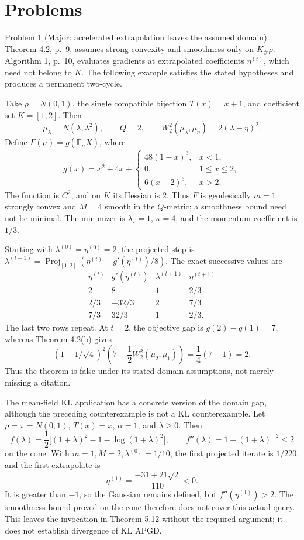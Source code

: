 \documentclass[10pt]{article}
\begin{document}
\section*{Problems}
Problem 1 (Major: accelerated extrapolation leaves the assumed domain).  Theorem 4.2, p. 9, assumes strong convexity and smoothness only on \(K_\#\rho\). Algorithm 1, p. 10, evaluates gradients at extrapolated coefficients \(\eta^{(t)}\), which need not belong to \(K\). The following example satisfies the stated hypotheses and produces a permanent two-cycle.\par
Take \(\rho=N(0,1)\), the single compatible bijection \(T(x)=x+1\), and coefficient set \(K=[1,2]\). Then \[\mu_\lambda=N(\lambda,\lambda^2),\qquad Q=2,\qquad
 W_2^2(\mu_\lambda,\mu_\eta)=2(\lambda-\eta)^2.\] Define \(F(\mu)=g(\mathbb E_\mu X)\), where \[g(x)=x^2+4x+
 \begin{cases}
 48(1-x)^3,&x<1,\\
 0,&1\leq x\leq2,\\
 6(x-2)^3,&x>2.
 \end{cases}\] The function is \(C^2\), and on \(K\) its Hessian is \(2\). Thus \(F\) is geodesically \(m=1\) strongly convex and \(M=4\) smooth in the \(Q\)-metric; a smoothness bound need not be minimal. The minimizer is \(\lambda_\star=1\), \(\kappa=4\), and the momentum coefficient is \(1/3\).\par
Starting with \(\lambda^{(0)}=\eta^{(0)}=2\), the projected step is \(\lambda^{(t+1)}=\mathop{\mathrm{Proj}}_{[1,2]}(\eta^{(t)}-g'(\eta^{(t)})/8)\). The exact successive values are \[\begin{array}{c|ccc}
 \eta^{(t)}&g'(\eta^{(t)})&\lambda^{(t+1)}&\eta^{(t+1)}\\ \hline
 2&8&1&2/3\\
 2/3&-32/3&2&7/3\\
 7/3&32/3&1&2/3 .
\end{array}\] The last two rows repeat. At \(t=2\), the objective gap is \(g(2)-g(1)=7\), whereas Theorem 4.2(b) gives \[(1-1/\sqrt4)^2
 \left(7+\frac12 W_2^2(\mu_2,\mu_1)\right)
 =\frac14(7+1)=2.\] Thus the theorem is false under its stated domain assumptions, not merely missing a citation.\par
The mean-field KL application has a concrete version of the domain gap, although the preceding counterexample is not a KL counterexample. Let \(\rho=\pi=N(0,1)\), \(T(x)=x\), \(\alpha=1\), and \(\lambda\geq0\). Then \[f(\lambda)=\frac12\bigl[(1+\lambda)^2-1-\log(1+\lambda)^2\bigr],
 \qquad f''(\lambda)=1+(1+\lambda)^{-2}\leq2\] on the cone. With \(m=1,M=2,\lambda^{(0)}=1/10\), the first projected iterate is \(1/220\), and the first extrapolate is \[\eta^{(1)}=\frac{-31+21\sqrt2}{110}<0.\] It is greater than \(-1\), so the Gaussian remains defined, but \(f''(\eta^{(1)})>2\). The smoothness bound proved on the cone therefore does not cover this actual query. This leaves the invocation in Theorem 5.12 without the required argument; it does not establish divergence of KL APGD.\par
\end{document}
